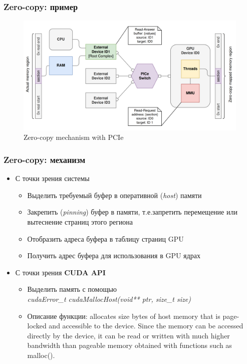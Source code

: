 \documentclass[xcolor=table,english]{beamer}
\begin{document}
\begin{frame}[fragile] \frametitle{Zero-copy: пример}
    \begin{center}
    \begin{minipage}[m]{0.95\linewidth}
        \begin{figure}
            \centering
            \includegraphics[width=\textwidth]{figures/zero_copy.png}
            \caption{Zero-copy mechanism with PCIe}
            \label{fig:zero_copy}
        \end{figure}
    \end{minipage}\hfill
    \end{center}
\end{frame}

\begin{frame}[fragile] \frametitle{Zero-copy: механизм}
     \begin{itemize}
         \item С точки зрения системы
         {
            \begin{itemize}
                \item Выделить требуемый буфер в оперативной (\textit{host}) памяти
                \item Закрепить (\textit{pinning}) буфер в памяти, т.е.запретить перемещение или вытеснение страниц этого региона 
                \item Отобразить адреса буфера в таблицу страниц GPU
                \item Получить адрес буфера для использования в GPU ядрах
            \end{itemize}
         }
         \item С точки зрения \textbf{CUDA API}
         {
            \begin{itemize}
                \item Выделить память с помощью \\ \textit{cudaError\_t cudaMallocHost(void** ptr, size\_t size)}
                \item Описание функции: allocates size bytes of host memory that is page-locked and accessible to the device. Since the memory can be accessed directly by the device, it can be read or written with much higher bandwidth than pageable memory obtained with functions such as malloc().
            \end{itemize}
         }
     \end{itemize}
\end{frame}
\end{document}
